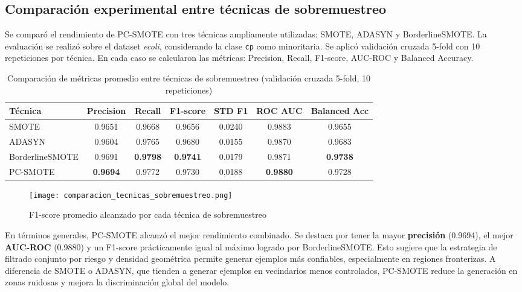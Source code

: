 
\subsection{Comparación experimental entre técnicas de sobremuestreo}

Se comparó el rendimiento de PC-SMOTE con tres técnicas ampliamente utilizadas: SMOTE, ADASYN y BorderlineSMOTE. La evaluación se realizó sobre el dataset \textit{ecoli}, considerando la clase \texttt{cp} como minoritaria. Se aplicó validación cruzada 5-fold con 10 repeticiones por técnica. En cada caso se calcularon las métricas: Precision, Recall, F1-score, AUC-ROC y Balanced Accuracy.

\begin{table}[H]
\centering
\caption{Comparación de métricas promedio entre técnicas de sobremuestreo (validación cruzada 5-fold, 10 repeticiones)}
\begin{tabular}{lcccccc}
\toprule
\textbf{Técnica} & \textbf{Precision} & \textbf{Recall} & \textbf{F1-score} & \textbf{STD F1} & \textbf{ROC AUC} & \textbf{Balanced Acc} \\
\midrule
SMOTE              & 0.9651 & 0.9668 & 0.9656 & 0.0240 & 0.9883 & 0.9655 \\
ADASYN             & 0.9604 & 0.9765 & 0.9680 & 0.0155 & 0.9870 & 0.9683 \\
BorderlineSMOTE    & 0.9691 & \textbf{0.9798} & \textbf{0.9741} & 0.0179 & 0.9871 & \textbf{0.9738} \\
PC-SMOTE           & \textbf{0.9694} & 0.9772 & 0.9730 & 0.0188 & \textbf{0.9880} & 0.9728 \\
\bottomrule
\end{tabular}
\end{table}

\begin{figure}[H]
\centering
\texttt{[image: comparacion\_tecnicas\_sobremuestreo.png]}

\caption{F1-score promedio alcanzado por cada técnica de sobremuestreo}
\end{figure}

En términos generales, PC-SMOTE alcanzó el mejor rendimiento combinado. Se destaca por tener la mayor \textbf{precisión} (0.9694), el mejor \textbf{AUC-ROC} (0.9880) y un F1-score prácticamente igual al máximo logrado por BorderlineSMOTE. Esto sugiere que la estrategia de filtrado conjunto por riesgo y densidad geométrica permite generar ejemplos más confiables, especialmente en regiones fronterizas. A diferencia de SMOTE o ADASYN, que tienden a generar ejemplos en vecindarios menos controlados, PC-SMOTE reduce la generación en zonas ruidosas y mejora la discriminación global del modelo.
